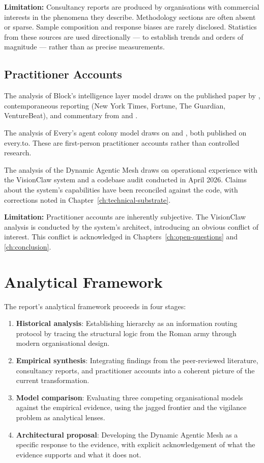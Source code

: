 \textbf{Limitation:} Consultancy reports are produced by organisations with commercial interests in the phenomena they describe. Methodology sections are often absent or sparse. Sample composition and response biases are rarely disclosed. Statistics from these sources are used directionally --- to establish trends and orders of magnitude --- rather than as precise measurements.

\subsection{Practitioner Accounts}

The analysis of Block's intelligence layer model draws on the published paper by \textcite{DorseyBotha2026}, contemporaneous reporting (New York Times, Fortune, The Guardian, VentureBeat), and commentary from \textcite{Zamost2026} and \textcite{Spicer2026}.

The analysis of Every's agent colony model draws on \textcite{Shipper2026} and \textcite{Klaassen2025}, both published on every.to. These are first-person practitioner accounts rather than controlled research.

The analysis of the Dynamic Agentic Mesh draws on operational experience with the VisionClaw system and a codebase audit conducted in April 2026. Claims about the system's capabilities have been reconciled against the code, with corrections noted in Chapter~\ref{ch:technical-substrate}.

\textbf{Limitation:} Practitioner accounts are inherently subjective. The VisionClaw analysis is conducted by the system's architect, introducing an obvious conflict of interest. This conflict is acknowledged in Chapters~\ref{ch:open-questions} and \ref{ch:conclusion}.

\section{Analytical Framework}

The report's analytical framework proceeds in four stages:

\begin{enumerate}
  \item \textbf{Historical analysis}: Establishing hierarchy as an information routing protocol by tracing the structural logic from the Roman army through modern organisational design.
  \item \textbf{Empirical synthesis}: Integrating findings from the peer-reviewed literature, consultancy reports, and practitioner accounts into a coherent picture of the current transformation.
  \item \textbf{Model comparison}: Evaluating three competing organisational models against the empirical evidence, using the jagged frontier and the vigilance problem as analytical lenses.
  \item \textbf{Architectural proposal}: Developing the Dynamic Agentic Mesh as a specific response to the evidence, with explicit acknowledgement of what the evidence supports and what it does not.
\end{enumerate}

